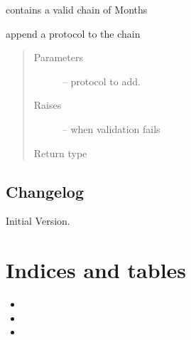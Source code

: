 \documentclass[letterpaper,10pt,english]{sphinxmanual}
\begin{document}
\begin{fulllineitems}
\label{\detokenize{devmanual:protocol.Season}}
contains a valid chain of Months

\begin{fulllineitems}
\label{\detokenize{devmanual:protocol.Season.add_month}}
append a protocol to the chain
\begin{quote}\begin{description}
\item[{Parameters}] \leavevmode
{} -- protocol to add.

\item[{Raises}] \leavevmode
{} -- when validation fails

\item[{Return type}] \leavevmode
{\hyperref[\detokenize{devmanual:protocol.Season}]{}}

\end{description}\end{quote}

\end{fulllineitems}


\end{fulllineitems}



\section{Changelog}
\label{\detokenize{changelog:changelog}}\label{\detokenize{changelog::doc}}
Initial Version.


\chapter{Indices and tables}
\label{\detokenize{index:indices-and-tables}}\begin{itemize}
\item {} 

\item {} 

\item {} 

\end{itemize}
\end{document}
